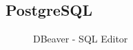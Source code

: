 \subsection{PostgreSQL}
\label{app:PostgreSQL}
\begin{figure}[htb]
\centering
{}
\caption{DBeaver - SQL Editor}
\end{figure}
